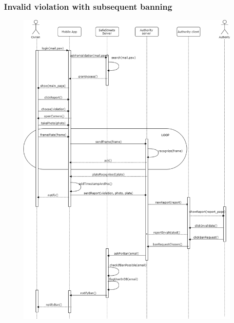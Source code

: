 \documentclass[12pt,a4paper]{article}
\begin{document}
		\subsubsection{Invalid violation with subsequent banning}
			\begin{figure}[H]
				\centering
				\includegraphics[width=.9\textwidth,height=.9\textheight,keepaspectratio]{Images/invalidation_banning}
				\label{fig:ass_request_sequence}
			\end{figure}
\end{document}
